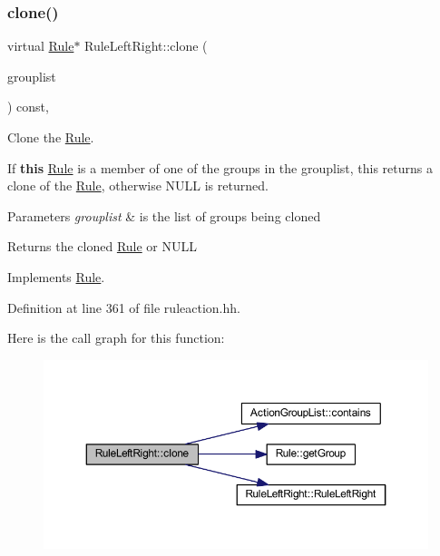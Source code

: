 \subsubsection{\texorpdfstring{clone()}{clone()}}
{\footnotesize\ttfamily virtual \mbox{\hyperlink{class_rule}{Rule}}$\ast$ Rule\+Left\+Right\+::clone (\begin{DoxyParamCaption}\item[{const \mbox{\hyperlink{class_action_group_list}{Action\+Group\+List}} \&}]{grouplist }\end{DoxyParamCaption}) const\hspace{0.3cm}{\ttfamily [inline]}, {\ttfamily [virtual]}}



Clone the \mbox{\hyperlink{class_rule}{Rule}}. 

If {\bfseries{this}} \mbox{\hyperlink{class_rule}{Rule}} is a member of one of the groups in the grouplist, this returns a clone of the \mbox{\hyperlink{class_rule}{Rule}}, otherwise N\+U\+LL is returned. 
\begin{DoxyParams}{Parameters}
{\em grouplist} & is the list of groups being cloned \\
\hline
\end{DoxyParams}
\begin{DoxyReturn}{Returns}
the cloned \mbox{\hyperlink{class_rule}{Rule}} or N\+U\+LL 
\end{DoxyReturn}


Implements \mbox{\hyperlink{class_rule_a70de90a76461bfa7ea0b575ce3c11e4d}{Rule}}.



Definition at line 361 of file ruleaction.\+hh.

Here is the call graph for this function\+:
\nopagebreak
\begin{figure}[H]
\begin{center}
\leavevmode
\includegraphics[width=350pt]{class_rule_left_right_aee62a865007b1395cf9716d3e1360111_cgraph}
\end{center}
\end{figure}
\mbox{\label{class_rule_left_right_abc57bab7e4b6cc0b7ca4b91cba34b7cd}} 
